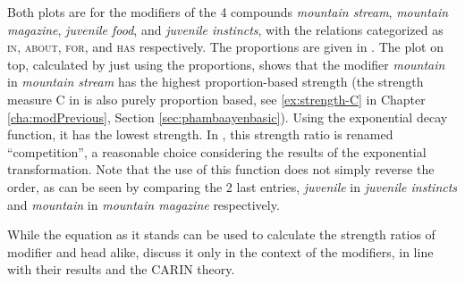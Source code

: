 \pagebreak[4]
Both plots are for the modifiers of the 4
compounds \emph{mountain stream}, \emph{mountain magazine},
\emph{juvenile food}, and \emph{juvenile instincts}, with the
relations categorized as \textsc{in}, \textsc{about}, \textsc{for},
and \textsc{has} respectively. The proportions are
given in \citet[81--82]{GagneandShoben:1997}. The plot on top, calculated by just
using the proportions, shows that the modifier \emph{mountain} in
\emph{mountain stream} has the highest proportion-based strength (the strength measure C in \citet{PhamandBaayen:2013} is also purely proportion based, see \ref{ex:strength-C} in Chapter \ref{cha:modPrevious}, Section \ref{sec:phambaayenbasic}). Using the
exponential decay function, it has the lowest strength.  In
\citet{SpaldingandGagne:2008}, this strength ratio is renamed
``competition'', a reasonable choice considering the results of the
exponential transformation. Note that the use of this function does
not simply reverse the order, as can be seen by comparing the 2 last
entries, \emph{juvenile} in \emph{juvenile instincts} and
\emph{mountain} in \emph{mountain magazine} respectively.

While the equation as it stands can be used
to calculate the strength ratios of modifier and head alike,
\citet{GagneandShoben:1997} discuss it only in the context of the
modifiers, in line with their results and the CARIN theory. 

